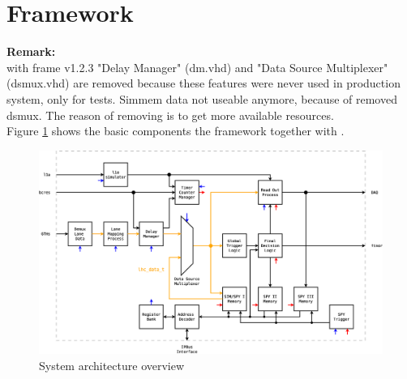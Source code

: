 %
\section{Framework}\label{sec:framework}
\textbf{Remark:}\\
with frame v1.2.3 "Delay Manager" (dm.vhd) and "Data Source Multiplexer" (dsmux.vhd) are removed because these features were never used in production system, only for tests.
Simmem data not useable anymore, because of removed dsmux.
The reason of removing is to get more available resources.\\

Figure \ref{fig_system_overview} shows the basic components the framework together with \rop. 
 
\begin{figure}[h]
\includegraphics[width=1.0\textwidth]{./figures/system_overview}
\caption{System architecture overview}
\label{fig_system_overview}
\end{figure}

